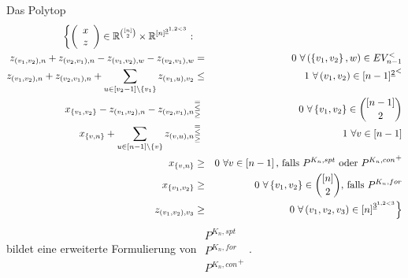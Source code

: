 \documentclass[10p,a4paper,BCOR = 12mm, DIV=15]{scrbook}
\begin{document}
\begin{Sa}
\label{sa:asymmetrisch_erweitert_konnektor4}
Das Polytop
\begin{eqnarray}
\left\{
\left(\begin{array}{c}
x \\
z
\end{array}\right)\in \mathbb{R}^{[n]\choose 2} \times \mathbb{R}^{\left[n\right]^{\underline{3}^{1, 2<3}}}: \nonumber\right. \\
z_{\left(v_1, v_2\right), n} + z_{\left(v_2, v_1\right), n} - z_{\left(v_1, v_2\right), w} - z_{\left(v_2, v_1\right), w} & = & 0\ \forall \left(\left\{v_1, v_2\right\}, w\right)\in EV_{n-1}^< \label{eq:sptkon_erweitert_asymm4_prim_1_1} \\
z_{\left(v_1, v_2\right), n} + z_{\left(v_2, v_1\right), n} + \sum_{u\in[v_2-1]\backslash\left\{v_1\right\}} z_{\left(v_1, u\right), v_2} & \leq & 1\ \forall \left(v_1, v_2\right)\in {[n-1]^{\underline{2}}}^<  \label{eq:sptkon_erweitert_asymm4_prim_2} \\
x_{\left\{v_1, v_2\right\}} - z_{\left(v_1, v_2\right), n} - z_{\left(v_2, v_1\right), n} & \substack{= \\ \leq \\ \geq} & 0\ \forall \left\{v_1, v_2\right\}\in {\left[n-1\right] \choose 2} \label{eq:sptkon_erweitert_asymm4_prim_1_2} \\
x_{\left\{v, n\right\}} + \sum_{u\in[n-1]\backslash\left\{v\right\}} z_{\left(v, u\right), n} & \substack{= \\ \leq \\ \geq} & 1\ \forall v \in [n-1] \label{eq:sptkon_erweitert_asymm4_prim_2,5} \\
x_{\left\{v, n\right\}} & \geq & 0 \ \forall v\in \left[n-1\right]\textnormal{, falls $P^{K_n, spt}$ oder ${P^{K_n, con}}^+$} \nonumber \\
x_{\left\{v_1, v_2\right\}} & \geq & 0 \ \forall \left\{v_1, v_2\right\}\in {\left[n\right] \choose 2}\textnormal{, falls $P^{K_n, for}$} \nonumber \\
z_{\left(v_1, v_2\right), v_3} & \geq & \left. 0 \ \forall \left(v_1, v_2, v_3\right)\in \left[n\right]^{\underline{3}^{1, 2<3}} \right\} \nonumber
\end{eqnarray}
bildet eine erweiterte Formulierung von $\substack{P^{K_n, spt} \\ P^{K_n, for} \\ {P^{K_n, con}}^+}$.
\end{Sa}
\end{document}
